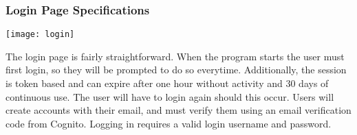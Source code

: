 \subsubsection{Login Page Specifications}
\begin{center}
	\texttt{[image: login]}
\end{center}
The login page is fairly straightforward. When the program starts the user must first login, so they will be prompted to do so everytime. Additionally, the session is token based and can expire after one hour without activity and 30 days of continuous use. The user will have to login again should this occur. Users will create accounts with their email, and must verify them using an email verification code from Cognito. Logging in requires a valid login username and password.\par

